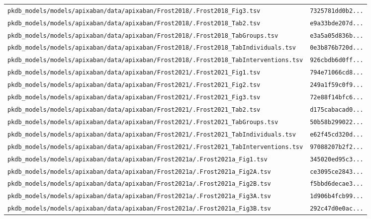\documentclass{article}
\begin{document}
\begin{longtable}{ll}
\texttt{pkdb\_models/models/apixaban/data/apixaban/Frost2018/.Frost2018\_Fig3.tsv} & \texttt{7325781dd0b2...} \\
\texttt{pkdb\_models/models/apixaban/data/apixaban/Frost2018/.Frost2018\_Tab2.tsv} & \texttt{e9a33bde207d...} \\
\texttt{pkdb\_models/models/apixaban/data/apixaban/Frost2018/.Frost2018\_TabGroups.tsv} & \texttt{e3a5a05d836b...} \\
\texttt{pkdb\_models/models/apixaban/data/apixaban/Frost2018/.Frost2018\_TabIndividuals.tsv} & \texttt{0e3b876b720d...} \\
\texttt{pkdb\_models/models/apixaban/data/apixaban/Frost2018/.Frost2018\_TabInterventions.tsv} & \texttt{926cbdb6d0ff...} \\
\texttt{pkdb\_models/models/apixaban/data/apixaban/Frost2021/.Frost2021\_Fig1.tsv} & \texttt{794e71066cd8...} \\
\texttt{pkdb\_models/models/apixaban/data/apixaban/Frost2021/.Frost2021\_Fig2.tsv} & \texttt{249a1f59c0f9...} \\
\texttt{pkdb\_models/models/apixaban/data/apixaban/Frost2021/.Frost2021\_Fig3.tsv} & \texttt{72e88f14bfc6...} \\
\texttt{pkdb\_models/models/apixaban/data/apixaban/Frost2021/.Frost2021\_Tab2.tsv} & \texttt{d175cabacad0...} \\
\texttt{pkdb\_models/models/apixaban/data/apixaban/Frost2021/.Frost2021\_TabGroups.tsv} & \texttt{50b58b299022...} \\
\texttt{pkdb\_models/models/apixaban/data/apixaban/Frost2021/.Frost2021\_TabIndividuals.tsv} & \texttt{e62f45cd320d...} \\
\texttt{pkdb\_models/models/apixaban/data/apixaban/Frost2021/.Frost2021\_TabInterventions.tsv} & \texttt{97088207b2f2...} \\
\texttt{pkdb\_models/models/apixaban/data/apixaban/Frost2021a/.Frost2021a\_Fig1.tsv} & \texttt{345020ed95c3...} \\
\texttt{pkdb\_models/models/apixaban/data/apixaban/Frost2021a/.Frost2021a\_Fig2A.tsv} & \texttt{ce3095ce2843...} \\
\texttt{pkdb\_models/models/apixaban/data/apixaban/Frost2021a/.Frost2021a\_Fig2B.tsv} & \texttt{f5bbd6decae3...} \\
\texttt{pkdb\_models/models/apixaban/data/apixaban/Frost2021a/.Frost2021a\_Fig3A.tsv} & \texttt{1d906b4fcb99...} \\
\texttt{pkdb\_models/models/apixaban/data/apixaban/Frost2021a/.Frost2021a\_Fig3B.tsv} & \texttt{292c47d0e0ac...} \\

\end{longtable}
\end{document}
